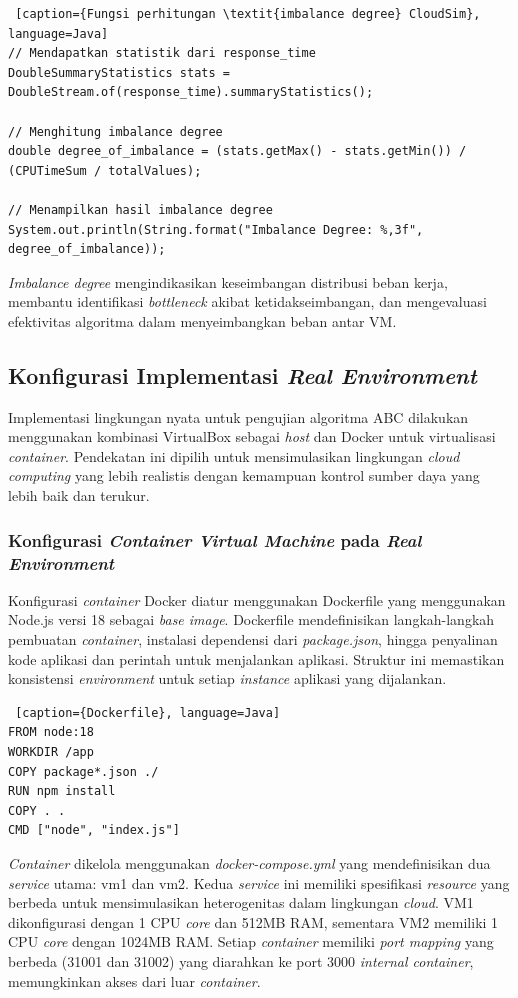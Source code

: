 \begin{lstlisting} [caption={Fungsi perhitungan \textit{imbalance degree} CloudSim}, language=Java]
// Mendapatkan statistik dari response_time
DoubleSummaryStatistics stats = DoubleStream.of(response_time).summaryStatistics();

// Menghitung imbalance degree
double degree_of_imbalance = (stats.getMax() - stats.getMin()) / (CPUTimeSum / totalValues);

// Menampilkan hasil imbalance degree
System.out.println(String.format("Imbalance Degree: %,3f", degree_of_imbalance));
\end{lstlisting}

\textit{Imbalance degree} mengindikasikan keseimbangan distribusi beban kerja, membantu identifikasi \textit{bottleneck} akibat ketidakseimbangan, dan mengevaluasi efektivitas algoritma dalam menyeimbangkan beban antar VM.

\subsection{Konfigurasi Implementasi \textit{Real Environment}}
Implementasi lingkungan nyata untuk pengujian algoritma ABC dilakukan menggunakan kombinasi VirtualBox sebagai \textit{host} dan Docker untuk virtualisasi \textit{container}. Pendekatan ini dipilih untuk mensimulasikan lingkungan \textit{cloud computing} yang lebih realistis dengan kemampuan kontrol sumber daya yang lebih baik dan terukur.

\subsubsection{Konfigurasi \textit{Container Virtual Machine} pada \textit{Real Environment}}
Konfigurasi \textit{container} Docker diatur menggunakan Dockerfile yang menggunakan Node.js versi 18 sebagai \textit{base image}. Dockerfile mendefinisikan langkah-langkah pembuatan \textit{container}, instalasi dependensi dari \textit{package.json}, hingga penyalinan kode aplikasi dan perintah untuk menjalankan aplikasi. Struktur ini memastikan konsistensi \textit{environment} untuk setiap \textit{instance} aplikasi yang dijalankan.

\begin{lstlisting} [caption={Dockerfile}, language=Java]
FROM node:18
WORKDIR /app
COPY package*.json ./
RUN npm install
COPY . .
CMD ["node", "index.js"]
\end{lstlisting}

\textit{Container} dikelola menggunakan \textit{docker-compose.yml} yang mendefinisikan dua \textit{service} utama: vm1 dan vm2. Kedua \textit{service} ini memiliki spesifikasi \textit{resource} yang berbeda untuk mensimulasikan heterogenitas dalam lingkungan \textit{cloud}. VM1 dikonfigurasi dengan 1 CPU \textit{core} dan 512MB RAM, sementara VM2 memiliki 1 CPU \textit{core} dengan 1024MB RAM. Setiap \textit{container} memiliki \textit{port mapping} yang berbeda (31001 dan 31002) yang diarahkan ke port 3000 \textit{internal container}, memungkinkan akses dari luar \textit{container}.

